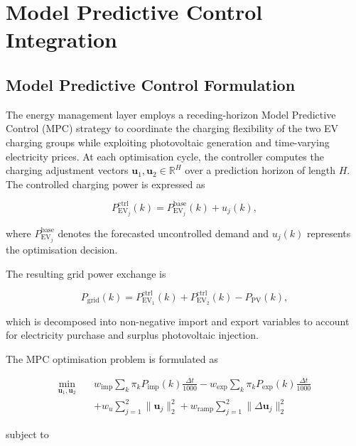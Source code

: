 \documentclass[journal]{IEEEtran}
\begin{document}
\section{Model Predictive Control Integration}
\label{sec:mpcintegration}

\subsection{Model Predictive Control Formulation}
\label{sec:mpc}

The energy management layer employs a receding-horizon Model Predictive
Control (MPC) strategy to coordinate the charging flexibility of the two
EV charging groups while exploiting photovoltaic generation and
time-varying electricity prices. At each optimisation cycle, the
controller computes the charging adjustment vectors
$\mathbf{u}_1,\mathbf{u}_2\in\mathbb{R}^{H}$ over a prediction horizon
of length $H$. The controlled charging power is expressed as

\[
P_{\mathrm{EV}_j}^{\mathrm{ctrl}}(k)
=
P_{\mathrm{EV}_j}^{\mathrm{base}}(k)
+
u_j(k),
\]

where $P_{\mathrm{EV}_j}^{\mathrm{base}}$ denotes the forecasted
uncontrolled demand and $u_j(k)$ represents the optimisation decision.

The resulting grid power exchange is

\[
P_{\mathrm{grid}}(k)
=
P_{\mathrm{EV}_1}^{\mathrm{ctrl}}(k)
+
P_{\mathrm{EV}_2}^{\mathrm{ctrl}}(k)
-
P_{\mathrm{PV}}(k),
\]

which is decomposed into non-negative import and export variables to
account for electricity purchase and surplus photovoltaic injection.

The MPC optimisation problem is formulated as

\begin{equation}
\begin{aligned}
\min_{\mathbf{u}_1,\mathbf{u}_2}
\quad &
w_{\mathrm{imp}}
\sum_k
\pi_k
P_{\mathrm{imp}}(k)
\frac{\Delta t}{1000}
-
w_{\mathrm{exp}}
\sum_k
\pi_k
P_{\mathrm{exp}}(k)
\frac{\Delta t}{1000}
\\
&
+
w_u
\sum_{j=1}^{2}
\|\mathbf{u}_j\|_2^2
+
w_{\mathrm{ramp}}
\sum_{j=1}^{2}
\|\Delta\mathbf{u}_j\|_2^2
\end{aligned}
\label{eq:mpc_objective}
\end{equation}

subject to
\end{document}
